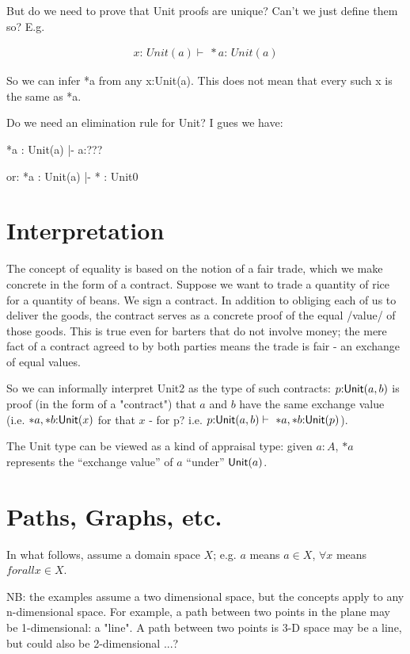 \documentclass{article}
\begin{document}
But do we need to prove that Unit proofs are unique?  Can't we just
define them so?  E.g.

\begin{align}
  x{:}\,Unit(a) \vdash\ *a{:}\,Unit(a)
\end{align}

So we can infer *a from any x:Unit(a).  This does not mean that every
such x is the same as *a.

Do we need an elimination rule for Unit?  I gues we have:

    *a : Unit(a) |-  a:???

or: *a : Unit(a) |-  * : Unit0

\section{Interpretation}

The concept of equality is based on the notion of a fair trade, which
we make concrete in the form of a contract.  Suppose we want to trade
a quantity of rice for a quantity of beans.  We sign a contract.  In
addition to obliging each of us to deliver the goods, the contract
serves as a concrete proof of the equal /value/ of those goods.  This
is true even for barters that do not involve money; the mere fact of a
contract agreed to by both parties means the trade is fair - an
exchange of equal values.

So we can informally interpret Unit2 as the type of such contracts:
\(p{:}\textsf{Unit}(a,b)\) is proof (in the form of a "contract") that \(a\)
and \(b\) have the same exchange value (i.e. \(*a, *b{:}\textsf{Unit}(x)\) for
that \(x\) - for p?  i.e. \(p{:}\textsf{Unit}(a,b)\vdash\ *a, *b{:}\textsf{Unit}(p)\)).

The Unit type can be viewed as a kind of appraisal type: given
\(a{:}A\), \(*a\) represents the ``exchange value'' of \(a\) ``under''
\(\textsf{Unit}(a)\).


\section{Paths, Graphs, etc.}

In what follows, assume a domain space \(X\); e.g. \(a\) means \(a\in
X\), \(\forall x\) means \(forall x\in X\).

NB: the examples assume a two dimensional space, but the concepts
apply to any n-dimensional space.  For example, a path between two
points in the plane may be 1-dimensional: a "line".  A path between two
points is 3-D space may be a line, but could also be 2-dimensional ...?
\end{document}
